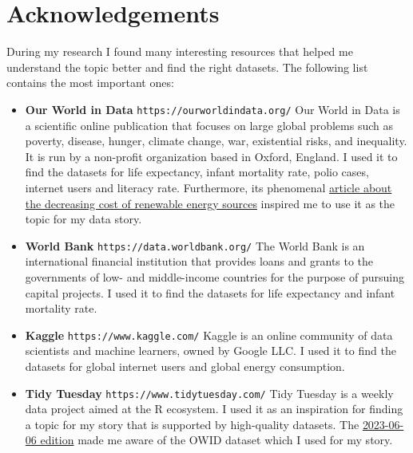 \documentclass{article}
\begin{document}
\newpage

\section{Acknowledgements}

During my research I found many interesting resources that helped me understand the topic better and find the right datasets.
The following list contains the most important ones:

\begin{itemize}
    \item \textbf{Our World in Data} \newline
    \texttt{https://ourworldindata.org/} \newline
    Our World in Data is a scientific online publication that focuses on large global problems such as poverty, disease, hunger, climate change, war, existential risks, and inequality.
    It is run by a non-profit organization based in Oxford, England.
    I used it to find the datasets for life expectancy, infant mortality rate, polio cases, internet users and literacy rate.\newline
    Furthermore, its phenomenal \href{https://ourworldindata.org/cheap-renewables-growth}{article about the decreasing cost of renewable energy sources} inspired me to use it as the topic for my data story.

    \item \textbf{World Bank} \newline
    \texttt{https://data.worldbank.org/} \newline
    The World Bank is an international financial institution that provides loans and grants to the governments of low- and middle-income countries for the purpose of pursuing capital projects.
    I used it to find the datasets for life expectancy and infant mortality rate.

    \item \textbf{Kaggle} \newline
    \texttt{https://www.kaggle.com/} \newline
    Kaggle is an online community of data scientists and machine learners, owned by Google LLC.
    I used it to find the datasets for global internet users and global energy consumption.

    \item \textbf{Tidy Tuesday} \newline
    \texttt{https://www.tidytuesday.com/} \newline
    Tidy Tuesday is a weekly data project aimed at the R ecosystem.
    I used it as an inspiration for finding a topic for my story that is supported by high-quality datasets.
    The \href{https://github.com/rfordatascience/tidytuesday/blob/master/data/2023/2023-06-06/readme.md}{2023-06-06 edition} made me aware of the OWID dataset which I used for my story.


\end{itemize}
\end{document}

